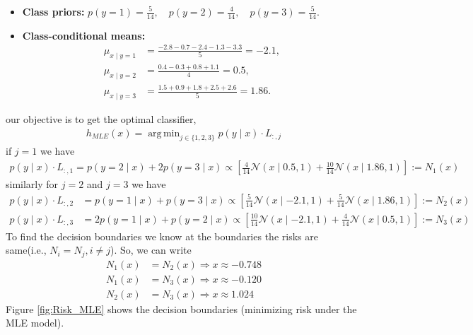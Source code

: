 \documentclass[solution,addpoints,12pt]{exam}
\DeclareMathOperator*{\argmin}{arg\,min}
\begin{document}
\begin{questions}
\begin{parts}
\begin{subparts}
\begin{solution}
	\begin{itemize}
		\item \textbf{Class priors:}
		$p(y=1) = \frac{5}{14}, \quad p(y=2) = \frac{4}{14}, \quad p(y=3) = \frac{5}{14}.$
		\item \textbf{Class-conditional means:}
		\begin{align*}
			\mu_{x \mid y=1} &= \frac{-2.8 - 0.7 - 2.4 - 1.3 - 3.3}{5} = -2.1,\\
			\mu_{x \mid y=2} &= \frac{0.4 - 0.3 + 0.8 + 1.1}{4} = 0.5,\\
			\mu_{x \mid y=3} &= \frac{1.5 + 0.9 + 1.8 + 2.5 + 2.6}{5} = 1.86.
		\end{align*}
	\end{itemize}
	our objective is to get the optimal classifier,
	\begin{align*}
		h_{MLE}(x)=\argmin_{j\in\{1,2,3\}} p(y\mid x)\cdot L_{:,j}
	\end{align*}
	if $j=1$ we have
	\begin{align*}
		p(y\mid x)\cdot L_{:,1} =p(y=2\mid x)+2p(y=3\mid x)\propto\left[\frac{4}{14}\mathcal{N}(x\mid 0.5,1)+\frac{10}{14}\mathcal{N}(x\mid 1.86,1)\right]:=N_1(x)
	\end{align*}
	similarly for $j=2 $ and $j=3$ we have
	\begin{align*}
		p(y\mid x)\cdot L_{:,2}& =p(y=1\mid x)+p(y=3\mid x)\propto\left[\frac{5}{14}\mathcal{N}(x\mid -2.1,1)+\frac{5}{14}\mathcal{N}(x\mid 1.86,1)\right]:=N_2(x)\\
		p(y\mid x)\cdot L_{:,3}& =2p(y=1\mid x)+p(y=2\mid x)\propto\left[\frac{10}{14}\mathcal{N}(x\mid -2.1,1)+\frac{4}{14}\mathcal{N}(x\mid 0.5,1)\right]:=N_3(x)
	\end{align*}
	To find the decision boundaries we know at the boundaries the risks are same(i.e., $N_i=N_j,i\neq j $). So, we can write
	\begin{align*}
		N_1(x)&=N_2(x)\Rightarrow x\approx -0.748\\
		N_1(x)&=N_3(x)\Rightarrow x\approx -0.120\\
		N_2(x)&=N_3(x)\Rightarrow x\approx 1.024
	\end{align*}
	Figure \ref{fig:Risk_MLE} shows the decision boundaries (minimizing risk under the MLE model).
	\begin{figure}[H]
		\centering
\end{figure}
\end{solution}
\end{subparts}
\end{parts}
\end{questions}
\end{document}
